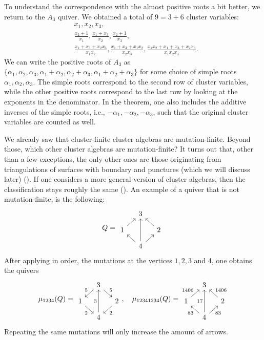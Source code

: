 To understand the correspondence with the almost positive roots a bit better, we return
to the $A_3$ quiver. We obtained a total of $9 = 3 + 6$ cluster variables:
\begin{align*}
	 & x_1, x_2, x_3,                                                                                               \\
	 & \frac{x_2 + 1}{x_1}, \frac{x_1 + x_3}{x_2}, \frac{x_2 + 1}{x_3},                                             \\
	 & \frac{x_1+x_3+x_2x_3}{x_1x_2}, \frac{x_1+x_3+x_1x_2}{x_2x_3}, \frac{x_1x_2 + x_1 + x_3 + x_2x_3}{x_1x_2x_3}.
\end{align*}
We can write the positive roots of $A_3$ as $\{\alpha_1, \alpha_2, \alpha_3, \alpha_1 + \alpha_2, \alpha_2 + \alpha_3, \alpha_1 + \alpha_2 + \alpha_3\}$ for some choice of simple roots $\alpha_1, \alpha_2, \alpha_3$. The simple roots correspond to the second row of cluster variables, while the other positive roots correspond to the last row by looking at the exponents in the denominator. In the theorem, one also includes the additive inverses of the simple roots, i.e., $-\alpha_1, -\alpha_2, -\alpha_3$, such that the original cluster variables are counted as well.

We already saw that cluster-finite cluster algebras are mutation-finite. Beyond those,
which other cluster algebras are mutation-finite? It turns out that, other than a few
exceptions, the only other ones are those originating from triangulations of surfaces
with boundary and punctures (which we will discuss later)
(\cite{FeliksonShapiroTumarkin2012SkewSCA}). If one considers a more general version of
cluster algebras, then the classification stays roughly the same
(\cite{FeliksonPavel2023cluster}). An example of a quiver that is not mutation-finite,
is the following:
\begin{equation*}
	Q =
	\begin{tikzcd}[sep = small]
		& 3 & \\
		1 \urar &&2 \ular \\
		& 4 \ular \ar[uu] \urar
	\end{tikzcd}
\end{equation*}
%
After applying in order, the mutations at the vertices $1,2,3$ and 4, one obtains the
quivers
\begin{equation*}
	\mu_{1234}(Q) =
	\begin{tikzcd}[sep = small]
		& 3 & \\
		1 \urar[leftarrow, "5"] &&2 \ular[leftarrow, "5"'] \\
		& 4 \ular[leftarrow, "2"] \ar[uu, "3"] \urar[leftarrow, "2"']
	\end{tikzcd}
	,\quad \mu_{12341234}(Q) =
	\begin{tikzcd}[sep = small]
		& 3 & \\
		1 \urar["1406"] &&2 \ular["1406"'] \\
		& 4 \ular["83"] \ar[uu, "17"] \urar["83"']
	\end{tikzcd}
\end{equation*}
%
Repeating the same mutations will only increase the amount of arrows. \medskip

